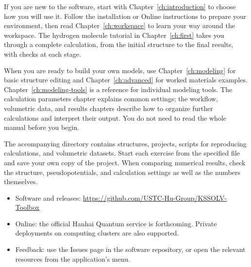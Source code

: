 If you are new to the software, start with Chapter~\ref{ch:introduction} to choose how you will use it. Follow the installation or Online instructions to prepare your environment, then read Chapter~\ref{ch:workspace} to learn your way around the workspace. The hydrogen molecule tutorial in Chapter~\ref{ch:first} takes you through a complete calculation, from the initial structure to the final results, with checks at each stage.

When you are ready to build your own models, use Chapter~\ref{ch:modeling} for basic structure editing and Chapter~\ref{ch:advanced} for worked materials examples. Chapter~\ref{ch:modeling-tools} is a reference for individual modeling tools. The calculation parameters chapter explains common settings; the workflow, volumetric data, and results chapters describe how to organize further calculations and interpret their output. You do not need to read the whole manual before you begin.

The accompanying  directory contains structures, projects, scripts for reproducing calculations, and volumetric datasets. Start each exercise from the specified file and save your own copy of the project. When comparing numerical results, check the structure, pseudopotentials, and calculation settings as well as the numbers themselves.

\vspace{\baselineskip}

\begin{itemize}
\item Software and releases: \url{https://github.com/USTC-Hu-Group/KSSOLV-Toolbox}
\item Online: the official Hanhai Quantum\regmark{} \ksonline{} service is forthcoming. Private deployments on computing clusters are also supported.
\item Feedback: use the Issues page in the software repository, or open the relevant resources from the application's  menu.
\end{itemize}

\clearpage
